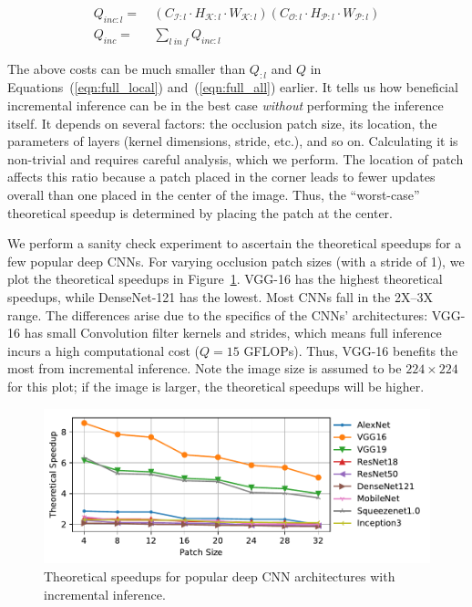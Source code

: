 \vspace{-2mm}
\begin{align}
\label{eqn:inc_local}
Q_{\mathit{inc}:l} =&~ (C_{\mathcal{I}:l} \cdot H_{\mathcal{K}:l} \cdot W_{\mathcal{K}:l})  (C_{\mathcal{O}:l} \cdot H_{\mathcal{P}:l} \cdot W_{\mathcal{P}:l})\\
\label{eqn:inc_all}
Q_\mathit{inc} =&~ \sum_{l~\mathit{in}~f} Q_{\mathit{inc}:l}
\end{align}

The above costs can be much smaller than $Q_{:l}$ and $Q$ in Equations~(\ref{eqn:full_local}) and~(\ref{eqn:full_all}) earlier.
 It tells us how beneficial incremental inference can be in the best case \textit{without} performing the inference itself. It depends on several factors: the occlusion patch size, its location, the parameters of layers (kernel dimensions, stride, etc.), and so on. Calculating it is non-trivial and requires careful analysis, which we perform. The location of patch affects this ratio because a patch placed in the corner leads to fewer updates overall than one placed in the center of the image. Thus, the ``worst-case'' theoretical speedup is determined by placing the patch at the center.

We perform a sanity check experiment to ascertain the theoretical speedups for a few popular deep CNNs. For varying occlusion patch sizes (with a stride of 1), we plot the theoretical speedups in Figure~\ref{fig:redundancy_ratio}. VGG-16 has the highest theoretical speedups, while DenseNet-121 has the lowest. Most CNNs fall in the 2X--3X range. The differences arise due to the specifics of the CNNs' architectures: VGG-16 has small Convolution filter kernels and strides, which means full inference incurs a high computational cost ($Q = 15$ GFLOPs). Thus, VGG-16 benefits the most from incremental inference. Note the image size is assumed to be $224 \times 224$ for this plot; if the image is larger, the theoretical speedups will be higher.

\begin{figure}[t]
\includegraphics[width=\columnwidth]{images/redundancy_ratio}
\vspace{-8mm}
\caption{Theoretical speedups for popular deep CNN architectures with incremental inference.}
\label{fig:redundancy_ratio}
\vspace{-4mm}
\end{figure}

